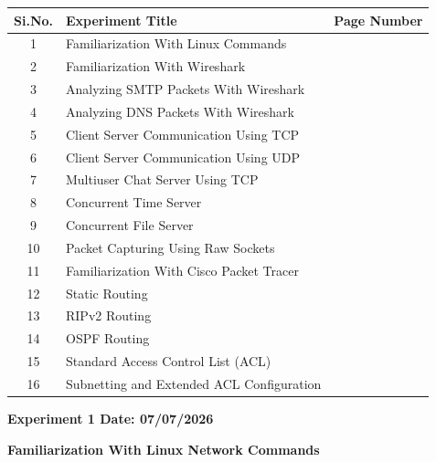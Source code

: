 \documentclass[12pt, a4paper]{report}
\begin{document}
\begin{table}[H]
	\centering
	\renewcommand{\arraystretch}{1.8}
	
	\begin{tabularx}{\textwidth}{@{}|c |X |c|@{}}
		\hline 
		\textbf{Si.No.} & \textbf{Experiment Title} & \textbf{Page Number} \\
		\hline 
		1  & Familiarization With Linux Commands & \pageref{exp:1} \\
		\hline 
		2  & Familiarization With Wireshark & \pageref{exp:2} \\
		\hline 
		3  & Analyzing SMTP Packets With Wireshark & \pageref{exp:3} \\
		\hline 
		4  & Analyzing DNS Packets With Wireshark & \pageref{exp:4} \\
		\hline 
		5  & Client Server Communication Using TCP & \pageref{exp:5} \\
		\hline 
		6  & Client Server Communication Using UDP & \pageref{exp:6} \\
		\hline 
		7  & Multiuser Chat Server Using TCP & \pageref{exp:7} \\
		\hline 
		8  & Concurrent Time Server & \pageref{exp:8} \\
		\hline 
		9  & Concurrent File Server & \pageref{exp:9} \\
		\hline 
		10 & Packet Capturing Using Raw Sockets & \pageref{exp:10} \\
		\hline 
		11 & Familiarization With Cisco Packet Tracer & \pageref{exp:11} \\
		\hline 
		12 & Static Routing & \pageref{exp:12} \\
		\hline 
		13 & RIPv2 Routing & \pageref{exp:13} \\
		\hline 
		14 & OSPF Routing & \pageref{exp:14} \\
		\hline 
		15 & Standard Access Control List (ACL) & \pageref{exp:15} \\
		\hline 
		16 & Subnetting and Extended ACL Configuration & \pageref{exp:16} \\
		\hline 
	\end{tabularx}
\end{table}


\newpage


\begin{center} 
	\bfseries 
	Experiment 1 \hfill Date: 07/07/2026
\end{center}

\label{exp:1}
\begin{center}
	{\bfseries \Huge Familiarization With Linux Network Commands \par}	
\end{center}
\end{document}
